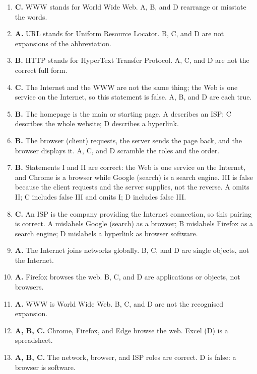 \documentclass[11pt]{article}
\begin{document}
\begin{enumerate}[label=\textbf{Q\arabic*.}, leftmargin=*]
  another page. A is a URL; B is an ISP; D is a browser.
\item \textbf{C.} WWW stands for World Wide Web. A, B, and D rearrange or
  misstate the words.
\item \textbf{A.} URL stands for Uniform Resource Locator. B, C, and D are
  not expansions of the abbreviation.
\item \textbf{B.} HTTP stands for HyperText Transfer Protocol. A, C, and D
  are not the correct full form.
\item \textbf{C.} The Internet and the WWW are not the same thing; the Web is
  one service on the Internet, so this statement is false. A, B, and D are
  each true.
\item \textbf{B.} The homepage is the main or starting page. A describes an
  ISP; C describes the whole website; D describes a hyperlink.
\item \textbf{B.} The browser (client) requests, the server sends the page
  back, and the browser displays it. A, C, and D scramble the roles and the
  order.
\item \textbf{B.} Statements I and II are correct: the Web is one service on
  the Internet, and Chrome is a browser while Google (search) is a search
  engine. III is false because the client requests and the server supplies,
  not the reverse. A omits II; C includes false III and omits I; D includes
  false III.
\item \textbf{C.} An ISP is the company providing the Internet connection, so
  this pairing is correct. A mislabels Google (search) as a browser; B
  mislabels Firefox as a search engine; D mislabels a hyperlink as browser
  software.

\item \textbf{A.} The Internet joins networks globally. B, C, and D are single objects, not the Internet.
\item \textbf{A.} Firefox browses the web. B, C, and D are applications or objects, not browsers.
\item \textbf{A.} WWW is World Wide Web. B, C, and D are not the recognised expansion.
\item \textbf{A, B, C.} Chrome, Firefox, and Edge browse the web. Excel (D) is a spreadsheet.
\item \textbf{A, B, C.} The network, browser, and ISP roles are correct. D is false: a browser is software.
\end{enumerate}
\def\JKSSBLessonID{34}\def\JKSSBAnswers{1}
\end{document}
